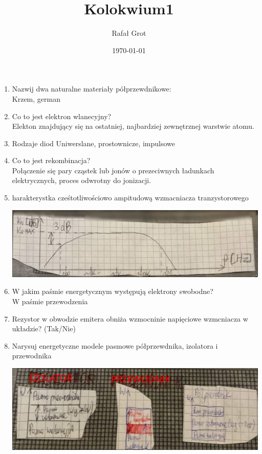 \documentclass[11pt]{article}
\author{Rafał Grot}
\date{\today}
\title{Kolokwium1}
\begin{document}
\maketitle
\tableofcontents

\begin{enumerate}
\item Nazwij dwa naturalne materiały półprzewdnikowe:\\\empty
Krzem, german
\item Co to jest elektron wlanecyjny?\\\empty
Elekton znajdujący się na ostatniej, najbardziej zewnętrznej warstwie atomu.
\item Rodzaje diod
Uniwerslane, prostownicze, impulsowe
\item Co to jest rekombinacja?\\\empty
Połączenie się pary cząstek lub jonów o prezeciwnych ładunkach elektrycznych, proces odwrotny do jonizacji.
\item harakterystka cześtotliwościowo ampitudową wzmacniacza tranzystorowego \begin{center}
\includegraphics[width=.9\linewidth]{charakterystkaczestotliwosociowamipitudowa.png}
\end{center}
\item W jakim paśmie energetycznym występują elektrony swobodne?\\\empty
W paśmie przewodzenia
\item Rezystor w obwodzie emitera obniża wzmocninie napięciowe wzmcniacza w układzie? (Tak/Nie)
\item Narysuj energetyczne modele pasmowe półprzewdnika, izolatora i przewodnika \begin{center}
\includegraphics[width=.9\linewidth]{modelepasmowe.png}

\end{center}
\end{enumerate}
\end{document}
